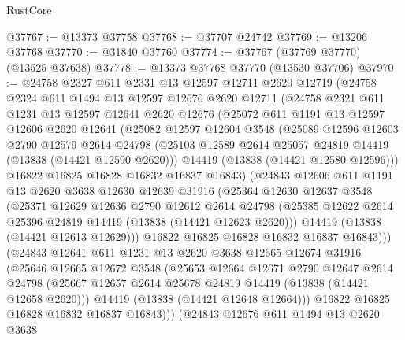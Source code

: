\begin{lexlean}{RustCore}
\begin{coremodule}
@37767 := @13373 @37758
@37768 := @37707 @24742
@37769 := @13206 @37768
@37770 := @31840 @37760
@37774 := @37767 (@37769 @37770) (@13525 @37638)
@37778 := @13373 @37768 @37770 (@13530 @37706)
@37970 := @24758
    @2327
    @611
    @2331
    @13
    @12597
    @12711
    @2620
    @12719
    (@24758
      @2324
      @611
      @1494
      @13
      @12597
      @12676
      @2620
      @12711
      (@24758
        @2321
        @611
        @1231
        @13
        @12597
        @12641
        @2620
        @12676
        (@25072
          @611
          @1191
          @13
          @12597
          @12606
          @2620
          @12641
          (@25082
            @12597
            @12604
            @3548
            (@25089
              @12596
              @12603
              @2790
              @12579
              @2614
              @24798
              (@25103 @12589 @2614 @25057 @24819 @14419 (@13838 (@14421 @12590 @2620)))
              @14419
              (@13838 (@14421 @12580 @12596)))
            @16822
            @16825
            @16828
            @16832
            @16837
            @16843)
          (@24843
            @12606
            @611
            @1191
            @13
            @2620
            @3638
            @12630
            @12639
            @31916
            (@25364
              @12630
              @12637
              @3548
              (@25371
                @12629
                @12636
                @2790
                @12612
                @2614
                @24798
                (@25385 @12622 @2614 @25396 @24819 @14419 (@13838 (@14421 @12623 @2620)))
                @14419
                (@13838 (@14421 @12613 @12629)))
              @16822
              @16825
              @16828
              @16832
              @16837
              @16843)))
        (@24843
          @12641
          @611
          @1231
          @13
          @2620
          @3638
          @12665
          @12674
          @31916
          (@25646
            @12665
            @12672
            @3548
            (@25653
              @12664
              @12671
              @2790
              @12647
              @2614
              @24798
              (@25667 @12657 @2614 @25678 @24819 @14419 (@13838 (@14421 @12658 @2620)))
              @14419
              (@13838 (@14421 @12648 @12664)))
            @16822
            @16825
            @16828
            @16832
            @16837
            @16843)))
      (@24843
        @12676
        @611
        @1494
        @13
        @2620
        @3638

\end{coremodule}
\end{lexlean}
